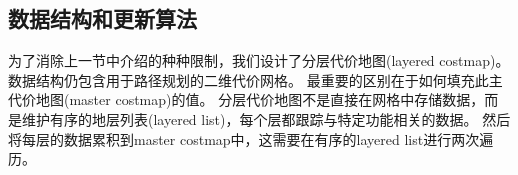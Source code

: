 \subsection{数据结构和更新算法}

为了消除上一节中介绍的种种限制，我们设计了分层代价地图(layered costmap)。 数据结构仍包含用于路径规划的二维代价网格。 最重要的区别在于如何填充此主代价地图(master costmap)的值。 分层代价地图不是直接在网格中存储数据，而是维护有序的地层列表(layered list)，每个层都跟踪与特定功能相关的数据。 然后将每层的数据累积到master costmap中，这需要在有序的layered list进行两次遍历。



